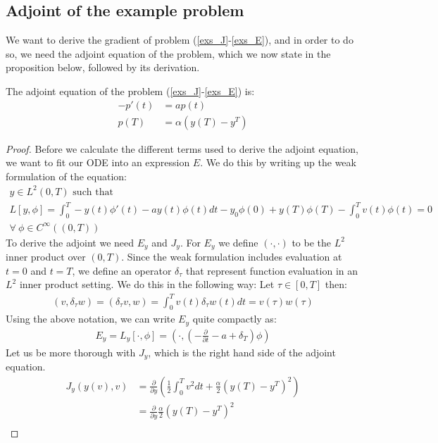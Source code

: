\subsection{Adjoint of the example problem}
We want to derive the gradient of problem (\ref{exs_J}-\ref{exs_E}), and in order to do so, we need the adjoint equation of the problem, which we now state in the proposition below, followed by its derivation.
\begin{proposition}
The adjoint equation of the problem (\ref{exs_J}-\ref{exs_E}) is:
\begin{align}     
-p'(t) &= ap(t) \label{exs_adjoint_eq}\\
p(T) &= \alpha(y(T)-y^T)   \label{exs_adjoint_ic}  
\end{align}
\end{proposition}
\begin{proof}
Before we calculate the different terms used to derive the adjoint equation, we want to fit our ODE into an expression $E$. We do this by writing up the weak formulation of the equation:
\begin{gather*}
\textrm{$y \in L^2(0,T)$ such that}\\
L[y,\phi] = \int_0^T-y(t)\phi'(t)-ay(t)\phi(t)dt -y_0\phi(0)+y(T)\phi(T)-\int_0^Tv(t)\phi(t)=0\\ \forall \ \phi \in C^{\infty}((0,T))
\end{gather*}
To derive the adjoint we need $E_y$ and $J_y$. For $E_y$ we define $(\cdot,\cdot)$ to be the $L^2$ inner product over $(0,T)$. Since the weak formulation includes evaluation at $t=0$ and $t=T$, we define an operator $\delta_{\tau}$ that represent function evaluation in an $L^2$ inner product setting. We do this in the following way: Let $\tau \in [0,T]$ then:
\begin{align*}
(v,\delta_{\tau}w) =(\delta_{\tau}v,w) = \int_0^Tv(t)\delta_{\tau}w(t)dt = v(\tau)w(\tau)
\end{align*}
Using the above notation, we can write $E_y$ quite compactly as:
\begin{align*}
E_y=L_y[\cdot,\phi]=(\cdot,(-\frac{\partial}{\partial t} - a + \delta_T)\phi)  
\end{align*}
Let us be more thorough with $J_y$, which is the right hand side of the adjoint equation.
\begin{align*}
J_y(y(v),v) &= \frac{\partial}{\partial y}(\frac{1}{2}\int_0^Tv^2dt + \frac{\alpha}{2}(y(T)-y^T)^2) \\ &= \frac{\partial}{\partial y} \frac{\alpha}{2}(y(T)-y^T)^2 \\

\end{align*}
\end{proof}
